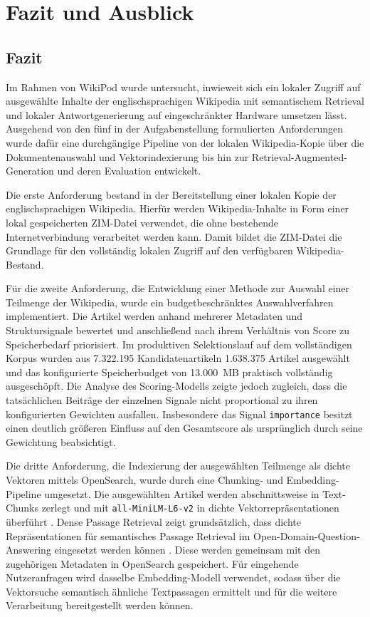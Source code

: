 \chapter{Fazit und Ausblick}
\label{ch:fazit}

\section{Fazit}

Im Rahmen von WikiPod wurde untersucht, inwieweit sich ein lokaler Zugriff auf
ausgewählte Inhalte der englischsprachigen Wikipedia mit semantischem Retrieval
und lokaler Antwortgenerierung auf eingeschränkter Hardware umsetzen lässt.
Ausgehend von den fünf in der Aufgabenstellung formulierten Anforderungen wurde
dafür eine durchgängige Pipeline von der lokalen Wikipedia-Kopie über die
Dokumentenauswahl und Vektorindexierung bis hin zur
Retrieval-Augmented-Generation und deren Evaluation entwickelt.

Die erste Anforderung bestand in der Bereitstellung einer lokalen Kopie der
englischsprachigen Wikipedia. Hierfür werden Wikipedia-Inhalte in Form einer
lokal gespeicherten ZIM-Datei verwendet, die ohne bestehende Internetverbindung
verarbeitet werden kann. Damit bildet die ZIM-Datei die Grundlage für den
vollständig lokalen Zugriff auf den verfügbaren Wikipedia-Bestand.

Für die zweite Anforderung, die Entwicklung einer Methode zur Auswahl einer
Teilmenge der Wikipedia, wurde ein budgetbeschränktes Auswahlverfahren
implementiert. Die Artikel werden anhand mehrerer Metadaten und
Struktursignale bewertet und anschließend nach ihrem Verhältnis von Score zu
Speicherbedarf priorisiert. Im produktiven Selektionslauf auf dem vollständigen
Korpus wurden aus 7.322.195 Kandidatenartikeln 1.638.375 Artikel ausgewählt und
das konfigurierte Speicherbudget von 13.000~MB praktisch vollständig
ausgeschöpft. Die Analyse des Scoring-Modells zeigte jedoch zugleich, dass die
tatsächlichen Beiträge der einzelnen Signale nicht proportional zu ihren
konfigurierten Gewichten ausfallen. Insbesondere das Signal
\texttt{importance} besitzt einen deutlich größeren Einfluss auf den
Gesamtscore als ursprünglich durch seine Gewichtung beabsichtigt.

Die dritte Anforderung, die Indexierung der ausgewählten Teilmenge als dichte
Vektoren mittels OpenSearch, wurde durch eine Chunking- und Embedding-Pipeline
umgesetzt. Die ausgewählten Artikel werden abschnittsweise in Text-Chunks
zerlegt und mit \texttt{all-MiniLM-L6-v2} in dichte Vektorrepräsentationen
überführt \cite{minilm-model-card,sbert-pretrained-models}. Dense
Passage Retrieval zeigt grundsätzlich, dass dichte Repräsentationen für
semantisches Passage Retrieval im Open-Domain-Question-Answering eingesetzt
werden können \cite{karpukhin-etal-2020-dense}. Diese werden gemeinsam mit den
zugehörigen Metadaten in OpenSearch gespeichert. Für eingehende Nutzeranfragen
wird dasselbe Embedding-Modell verwendet, sodass über die Vektorsuche
semantisch ähnliche Textpassagen ermittelt und für die weitere Verarbeitung
bereitgestellt werden können.

